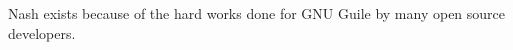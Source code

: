 \documentclass[preprint, 10pt]{sigplanconf}
\begin{document}

\acks{} Nash exists because of the hard works done for GNU Guile by many open
source developers.







\end{document}
